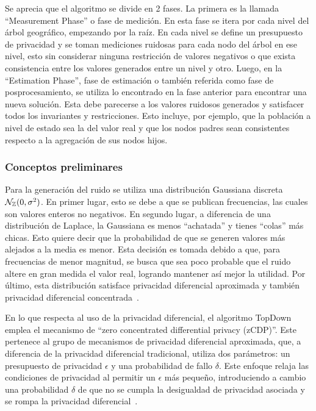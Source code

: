 \documentclass[informe]{upropuesta}
\begin{document}
Se aprecia que el algoritmo se divide en 2 fases. La primera es la llamada “Measurement Phase” o fase de medición. En esta fase se itera por cada nivel del árbol geográfico, empezando por la raíz. En cada nivel se define un presupuesto de privacidad y se toman mediciones ruidosas para cada nodo del árbol en ese nivel, esto sin considerar ninguna restricción de valores negativos o que exista consistencia entre los valores generados entre un nivel y otro. Luego, en la “Estimation Phase”, fase de estimación o también referida como fase de posprocesamiento, se utiliza lo encontrado en la fase anterior para encontrar una nueva solución. Esta debe parecerse a los valores ruidosos generados y satisfacer todos los invariantes y restricciones. Esto incluye, por ejemplo, que la población a nivel de estado sea la del valor real y que los nodos padres sean consistentes respecto a la agregación de sus nodos hijos.

\subsubsection*{Conceptos preliminares}

Para la generación del ruido se utiliza una distribución Gaussiana discreta $\mathcal{N}_{\mathbb{Z}}(0, \sigma^2)$. En primer lugar, esto se debe a que se publican frecuencias, las cuales son valores enteros no negativos. En segundo lugar, a diferencia de una distribución de Laplace, la Gaussiana es menos “achatada” y tienes “colas” más chicas. Esto quiere decir que la probabilidad de que se generen valores más alejados a la media es menor. Esta decisión es tomada debido a que, para frecuencias de menor magnitud, se busca que sea poco probable que el ruido altere en gran medida el valor real, logrando mantener así mejor la utilidad. Por último, esta distribución satisface privacidad diferencial aproximada y también privacidad diferencial concentrada~\cite{NEURIPS2020_b53b3a3d}. 

En lo que respecta al uso de la privacidad diferencial, el algoritmo TopDown emplea el mecanismo de “zero concentrated differential privacy (zCDP)”. Este pertenece al grupo de mecanismos de privacidad diferencial aproximada, que, a diferencia de la privacidad diferencial tradicional, utiliza dos parámetros: un presupuesto de privacidad $\epsilon$ y una probabilidad de fallo $\delta$. Este enfoque relaja las condiciones de privacidad al permitir un $\epsilon$ más pequeño, introduciendo a cambio una probabilidad $\delta$ de que no se cumpla la desigualdad de privacidad asociada y se rompa la privacidad diferencial~\cite{near_abuah_2021}. 
\end{document}
